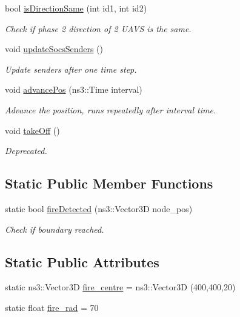 \begin{DoxyCompactItemize}
bool \hyperlink{classrnl_1_1Planner_a2120744f60206f71e1b773d8d9350338}{is\+Direction\+Same} (int id1, int id2)
\begin{DoxyCompactList}\small\item\em Check if phase 2 direction of 2 U\+A\+VS is the same. \end{DoxyCompactList}\item 
\mbox{\label{classrnl_1_1Planner_a1633c873eb56e2c7ba6a8307c32768d5}} 
void \hyperlink{classrnl_1_1Planner_a1633c873eb56e2c7ba6a8307c32768d5}{update\+Socs\+Senders} ()
\begin{DoxyCompactList}\small\item\em Update senders after one time step. \end{DoxyCompactList}\item 
void \hyperlink{classrnl_1_1Planner_ac3647c6d576412e08dbb9006b7f796ec}{advance\+Pos} (ns3\+::\+Time interval)
\begin{DoxyCompactList}\small\item\em Advance the position, runs repeatedly after interval time. \end{DoxyCompactList}\item 
\mbox{\label{classrnl_1_1Planner_af9294d6891f205fb3140255c924da612}} 
void \hyperlink{classrnl_1_1Planner_af9294d6891f205fb3140255c924da612}{take\+Off} ()
\begin{DoxyCompactList}\small\item\em Deprecated. \end{DoxyCompactList}\end{DoxyCompactItemize}
\subsection*{Static Public Member Functions}
\begin{DoxyCompactItemize}
\item 
static bool \hyperlink{classrnl_1_1Planner_ab528c41d9ed5dc81eb21863593ba9235}{fire\+Detected} (ns3\+::\+Vector3D node\+\_\+pos)
\begin{DoxyCompactList}\small\item\em Check if boundary reached. \end{DoxyCompactList}\end{DoxyCompactItemize}
\subsection*{Static Public Attributes}
\begin{DoxyCompactItemize}
\item 
static ns3\+::\+Vector3D \hyperlink{classrnl_1_1Planner_a12c02257f8ca2e08030a6469d985bf83}{fire\+\_\+centre} = ns3\+::\+Vector3D (400,400,20)
\item 
static float \hyperlink{classrnl_1_1Planner_a97417a218c9ff97822d71b1a26075263}{fire\+\_\+rad} = 70
\end{DoxyCompactItemize}


